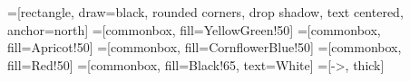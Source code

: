=[rectangle, draw=black, rounded corners, drop shadow,
	text centered, anchor=north]
=[commonbox, fill=YellowGreen!50]
=[commonbox, fill=Apricot!50]
=[commonbox, fill=CornflowerBlue!50]
=[commonbox, fill=Red!50]
=[commonbox, fill=Black!65, text=White]
=[->, thick]
